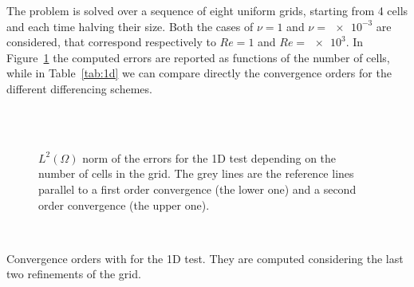 The problem is solved over a sequence of eight uniform grids, starting from 
4 cells and each time halving their size. Both the cases of $\nu=1$ 
and $\nu=\num{e-3}$ are considered, that correspond respectively to $Re=1$ and $Re=\num{e3}$. In Figure~\ref{fig:1d_err} the computed errors are reported as functions of the number of cells, while in 
Table~\ref{tab:1d} we can compare directly the 
convergence orders for the different differencing schemes.
\begin{figure}
	\centering
	\subfloat[Upwind, $Re = 1$]{
		}
	\subfloat[Upwind, $Re = \num{e3}$]{
		}\\
	\subfloat[Min-Mod, $Re = 1$]{
		}
	\subfloat[Min-Mod, $Re = \num{e3}$]{
		}\\
	\subfloat[Van Leer, $Re = 1$]{
		}
	\subfloat[Van Leer, $Re = \num{e3}$]{
		}
	\caption[$L^2(\Omega)$ norm of the errors for the 1D test]{$L^2(\Omega)$ 
	norm of the errors for the 1D test 
	depending on the number of cells in the grid. The grey lines are the reference lines parallel to a first order convergence (the lower one) and a second order convergence (the upper one).}
	\label{fig:1d_err}
\end{figure}
\begin{table}
	\centering
	\\
	\caption[Convergence orders for the 1D 
	test]{Convergence orders with for the 1D test. They 
	are computed considering the last two refinements of the grid.}
	\label{tab:1d}
\end{table}


